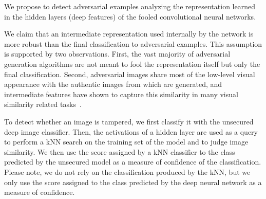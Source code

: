 
We propose to detect adversarial examples analyzing the representation learned in the hidden layers (deep features) of the fooled convolutional neural networks.

We claim that an intermediate representation used internally by the network is more robust than the final classification to adversarial examples.
This assumption is supported by two observations.
First, the vast majority of adversarial generation algorithms are not meant to fool the representation itself but only the final classification.
Second, adversarial images share most of the low-level visual appearance with the authentic images from which are generated, and intermediate features have shown to capture this similarity in many visual similarity related tasks~\cite{sharif2014cnn,gordo2016deep}.

To detect whether an image is tampered, we first classify it with the unsecured deep image classifier.
Then, the activations of a hidden layer are used as a query to perform a kNN search on the training set of the model and to judge image similarity.
We then use the score assigned by a kNN classifier to the class predicted by the unsecured model as a measure of confidence of the classification.
Please note, we do not rely on the classification produced by the kNN, but we only use the score assigned to the class predicted by the deep neural network as a measure of confidence.

